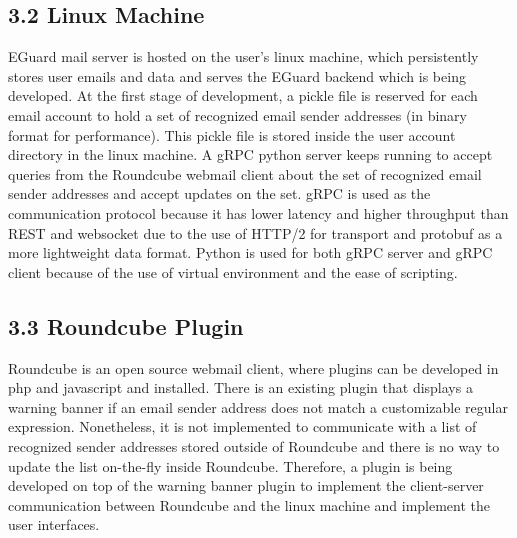 \documentclass[11pt]{article}
\begin{document}
\subsection*{3.2 \hspace{10pt} Linux Machine}
EGuard mail server is hosted on the user's linux machine, which persistently stores user emails and data and serves the EGuard backend which is being developed. At the first stage of development, a pickle file is reserved for each email account to hold a set of recognized email sender addresses (in binary format for performance). This pickle file is stored inside the user account directory in the linux machine. A gRPC python server keeps running to accept queries from the Roundcube webmail client about the set of recognized email sender addresses and accept updates on the set. gRPC is used as the communication protocol because it has lower latency and higher throughput than REST and websocket due to the use of HTTP/2 for transport and protobuf as a more lightweight data format. Python is used for both gRPC server and gRPC client because of the use of virtual environment and the ease of scripting.

\subsection*{3.3 \hspace{10pt} Roundcube Plugin}
Roundcube is an open source webmail client, where plugins can be developed in php and javascript and installed. There is an existing plugin that displays a warning banner if an email sender address does not match a customizable regular expression. Nonetheless, it is not implemented to communicate with a list of recognized sender addresses stored outside of Roundcube and there is no way to update the list on-the-fly inside Roundcube. Therefore, a plugin is being developed on top of the warning banner plugin to implement the client-server communication between Roundcube and the linux machine and implement the user interfaces.
\end{document}

